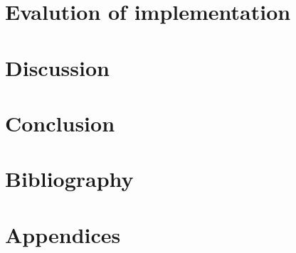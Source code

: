 \documentclass{article}
\begin{document}
\section{Evalution of implementation}
\label{sec:evaluation}

\clearpage

\section{Discussion}
\label{sec:discussion}

\clearpage

\section{Conclusion}
\label{sec:conclusion}

\clearpage

\section{Bibliography}

\clearpage

\section{Appendices}

\end{document}
